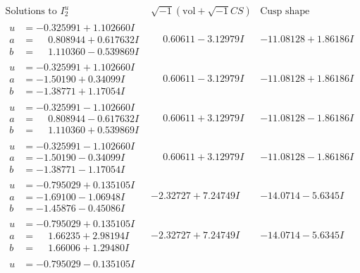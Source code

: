 \documentclass[1p]{elsarticle_modified}
\theoremstyle{definition}
\newcommand{\I}{\sqrt{-1}}
\begin{document}
$$\begin{array}{c|c|c}  
\text{Solutions to }I^u_{2}& \I (\text{vol} + \sqrt{-1}CS) & \text{Cusp shape}\\
 \hline 
\begin{aligned}
u &= -0.325991 + 1.102660 I \\
a &= \phantom{-}0.808944 + 0.617632 I \\
b &= \phantom{-}1.110360 - 0.539869 I\end{aligned}
 & \phantom{-}0.60611 - 3.12979 I & -11.08128 + 1.86186 I \\ \hline\begin{aligned}
u &= -0.325991 + 1.102660 I \\
a &= -1.50190 + 0.34099 I \\
b &= -1.38771 + 1.17054 I\end{aligned}
 & \phantom{-}0.60611 - 3.12979 I & -11.08128 + 1.86186 I \\ \hline\begin{aligned}
u &= -0.325991 - 1.102660 I \\
a &= \phantom{-}0.808944 - 0.617632 I \\
b &= \phantom{-}1.110360 + 0.539869 I\end{aligned}
 & \phantom{-}0.60611 + 3.12979 I & -11.08128 - 1.86186 I \\ \hline\begin{aligned}
u &= -0.325991 - 1.102660 I \\
a &= -1.50190 - 0.34099 I \\
b &= -1.38771 - 1.17054 I\end{aligned}
 & \phantom{-}0.60611 + 3.12979 I & -11.08128 - 1.86186 I \\ \hline\begin{aligned}
u &= -0.795029 + 0.135105 I \\
a &= -1.69100 - 1.06948 I \\
b &= -1.45876 - 0.45086 I\end{aligned}
 & -2.32727 + 7.24749 I & -14.0714 - 5.6345 I \\ \hline\begin{aligned}
u &= -0.795029 + 0.135105 I \\
a &= \phantom{-}1.66235 + 2.98194 I \\
b &= \phantom{-}1.66006 + 1.29480 I\end{aligned}
 & -2.32727 + 7.24749 I & -14.0714 - 5.6345 I \\ \hline\begin{aligned}
u &= -0.795029 - 0.135105 I \\

\end{aligned}
\end{array}$$
\end{document}
